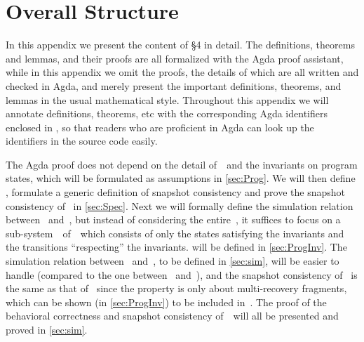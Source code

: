 
\section{Overall Structure}


In this appendix we present the content of \S4 in detail. The definitions, theorems and lemmas, and their proofs are all formalized with the Agda proof assistant, while in this appendix we omit the proofs, the details of which are all written and checked in Agda, and merely present the important definitions, theorems, and lemmas in the usual mathematical style.
Throughout this appendix we will annotate definitions, theorems, etc with the corresponding Agda identifiers enclosed in \AgdaId{\cdot}, so that readers who are proficient in Agda can look up the identifiers in the source code easily.

The Agda proof does not depend on the detail of~\Prog\ and the invariants on program states, which will be formulated as assumptions in \cref{sec:Prog}.
We will then define \Spec, formulate a generic definition of snapshot consistency and prove the snapshot consistency of \Spec\ in \cref{sec:Spec}.
Next we will formally define the simulation relation between \Prog~and~\Spec, but instead of considering the entire~\Prog, it suffices to focus on a sub-system~\ProgInv\ of~\Prog\ which consists of only the states satisfying the invariants and the transitions ``respecting'' the invariants. \ProgInv will be defined in \cref{sec:ProgInv}.
The simulation relation between \ProgInv~and~\Spec, to be defined in \cref{sec:sim}, will be easier to handle (compared to the one between \Prog~and~\Spec), and the snapshot consistency of \ProgInv\ is the same as that of \Prog\ since the property is only about multi-recovery fragments, which can be shown (in \cref{sec:ProgInv}) to be included in~\ProgInv.
The proof of the behavioral correctness and snapshot consistency of~\ProgInv\ will all be presented and proved in \cref{sec:sim}. 
